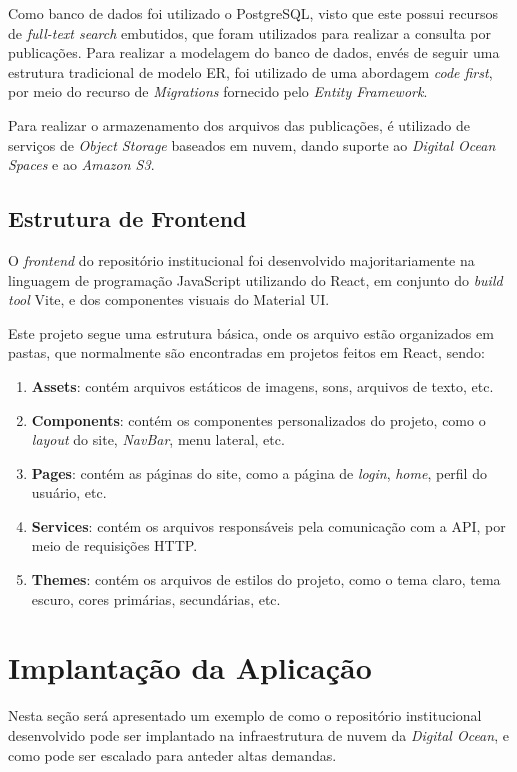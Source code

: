 Como banco de dados foi utilizado o PostgreSQL, visto que este possui recursos de
\emph{full-text search} embutidos, que foram utilizados para realizar a consulta
por publicações. Para realizar a modelagem do banco de dados, envés de seguir
uma estrutura tradicional de modelo ER, foi utilizado de uma abordagem
\emph{code first}, por meio do recurso de \emph{Migrations} fornecido pelo
\emph{Entity Framework}.

Para realizar o armazenamento dos arquivos das publicações, é utilizado de serviços de
\emph{Object Storage} baseados em nuvem, dando suporte ao \emph{Digital Ocean Spaces}
e ao \emph{Amazon S3}.

\subsection{Estrutura de Frontend}

O \emph{frontend} do repositório institucional foi desenvolvido majoritariamente
na linguagem de programação JavaScript utilizando do React, em conjunto do
\emph{build tool} Vite, e dos componentes visuais do Material UI.

Este projeto segue uma estrutura básica, onde os arquivo estão organizados
em pastas, que normalmente são encontradas em projetos feitos em React, sendo:
\begin{enumerate}
    \item \textbf{Assets}: contém arquivos estáticos de imagens, sons,
          arquivos de texto, etc.
    \item \textbf{Components}: contém os componentes personalizados do projeto,
          como o \emph{layout} do site, \emph{NavBar}, menu lateral, etc.
    \item \textbf{Pages}: contém as páginas do site, como a página de \emph{login},
          \emph{home}, perfil do usuário, etc.
    \item \textbf{Services}: contém os arquivos responsáveis pela comunicação
          com a API, por meio de requisições HTTP.
    \item \textbf{Themes}: contém os arquivos de estilos do projeto, como
          o tema claro, tema escuro, cores primárias, secundárias, etc.
\end{enumerate}

\section{Implantação da Aplicação}

Nesta seção será apresentado um exemplo de como o repositório institucional
desenvolvido pode ser implantado na infraestrutura de nuvem da \emph{Digital Ocean},
e como pode ser escalado para anteder altas demandas.

